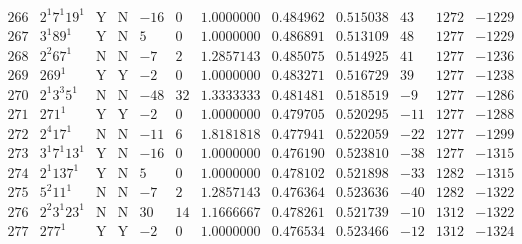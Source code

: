 \documentclass[11pt,reqno,a4letter]{article}
\numberwithin{figure}{section}
\numberwithin{table}{section}
\theoremstyle{plain}
\numberwithin{theorem}{section}
\theoremstyle{definition}
\begin{document}
\begin{table}[h!]
\begin{equation*}
{\begin{array}{cc|cc|ccc|cc|ccc}
 266 & 2^1 7^1 19^1 & \text{Y} & \text{N} & -16 & 0 & 1.0000000 & 0.484962 & 0.515038 & 43 & 1272 & -1229 \\
 267 & 3^1 89^1 & \text{Y} & \text{N} & 5 & 0 & 1.0000000 & 0.486891 & 0.513109 & 48 & 1277 & -1229 \\
 268 & 2^2 67^1 & \text{N} & \text{N} & -7 & 2 & 1.2857143 & 0.485075 & 0.514925 & 41 & 1277 & -1236 \\
 269 & 269^1 & \text{Y} & \text{Y} & -2 & 0 & 1.0000000 & 0.483271 & 0.516729 & 39 & 1277 & -1238 \\
 270 & 2^1 3^3 5^1 & \text{N} & \text{N} & -48 & 32 & 1.3333333 & 0.481481 & 0.518519 & -9 & 1277 & -1286 \\
 271 & 271^1 & \text{Y} & \text{Y} & -2 & 0 & 1.0000000 & 0.479705 & 0.520295 & -11 & 1277 & -1288 \\
 272 & 2^4 17^1 & \text{N} & \text{N} & -11 & 6 & 1.8181818 & 0.477941 & 0.522059 & -22 & 1277 & -1299 \\
 273 & 3^1 7^1 13^1 & \text{Y} & \text{N} & -16 & 0 & 1.0000000 & 0.476190 & 0.523810 & -38 & 1277 & -1315 \\
 274 & 2^1 137^1 & \text{Y} & \text{N} & 5 & 0 & 1.0000000 & 0.478102 & 0.521898 & -33 & 1282 & -1315 \\
 275 & 5^2 11^1 & \text{N} & \text{N} & -7 & 2 & 1.2857143 & 0.476364 & 0.523636 & -40 & 1282 & -1322 \\
 276 & 2^2 3^1 23^1 & \text{N} & \text{N} & 30 & 14 & 1.1666667 & 0.478261 & 0.521739 & -10 & 1312 & -1322 \\
 277 & 277^1 & \text{Y} & \text{Y} & -2 & 0 & 1.0000000 & 0.476534 & 0.523466 & -12 & 1312 & -1324 \\ 
\end{array}
}
\end{equation*}

\end{table} 
\end{document}
